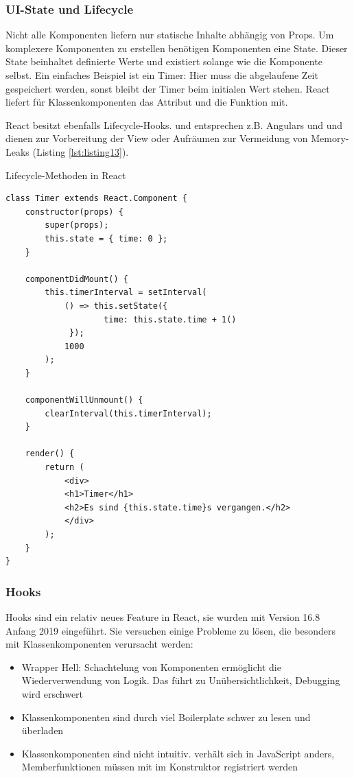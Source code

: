 \subsubsection{UI-State und Lifecycle}
Nicht alle Komponenten liefern nur statische Inhalte abhängig von Props. Um komplexere Komponenten zu erstellen benötigen Komponenten eine State. Dieser State beinhaltet definierte Werte und existiert solange wie die Komponente selbst. Ein einfaches Beispiel ist ein Timer: Hier muss die abgelaufene Zeit gespeichert werden, sonst bleibt der Timer beim initialen Wert stehen. React liefert für Klassenkomponenten das Attribut  und die Funktion  mit. 

React besitzt ebenfalls Lifecycle-Hooks.  und  entsprechen z.B. Angulars  und  und dienen zur Vorbereitung der View oder Aufräumen zur Vermeidung von Memory-Leaks (Listing \ref{lst:listing13}).
 
\begin{listing}
\caption{Lifecycle-Methoden in React}
\label{lst:listing13}
\begin{verbatim}
class Timer extends React.Component {
    constructor(props) {
        super(props);
        this.state = { time: 0 };
    }

    componentDidMount() {
        this.timerInterval = setInterval(
            () => this.setState({
                    time: this.state.time + 1()
             });
            1000
        );
    }

    componentWillUnmount() {
        clearInterval(this.timerInterval);
    }

    render() {
        return (
            <div>
            <h1>Timer</h1>
            <h2>Es sind {this.state.time}s vergangen.</h2>
            </div>
        );
    }
}
\end{verbatim}
\end{listing}

\subsubsection{Hooks}
Hooks sind ein relativ neues Feature in React, sie wurden mit Version 16.8 Anfang 2019 eingeführt. Sie versuchen einige Probleme zu lösen, die besonders mit Klassenkomponenten verursacht werden: 

\begin{itemize}
    \item Wrapper Hell: Schachtelung von Komponenten ermöglicht die Wiederverwendung von Logik. Das führt zu Unübersichtlichkeit, Debugging wird erschwert
    \item Klassenkomponenten sind durch viel Boilerplate schwer zu lesen und überladen
    \item Klassenkomponenten sind nicht intuitiv.  verhält sich in JavaScript anders, Memberfunktionen müssen mit  im Konstruktor registriert werden\cite{HooksYoutube}
\end{itemize}

